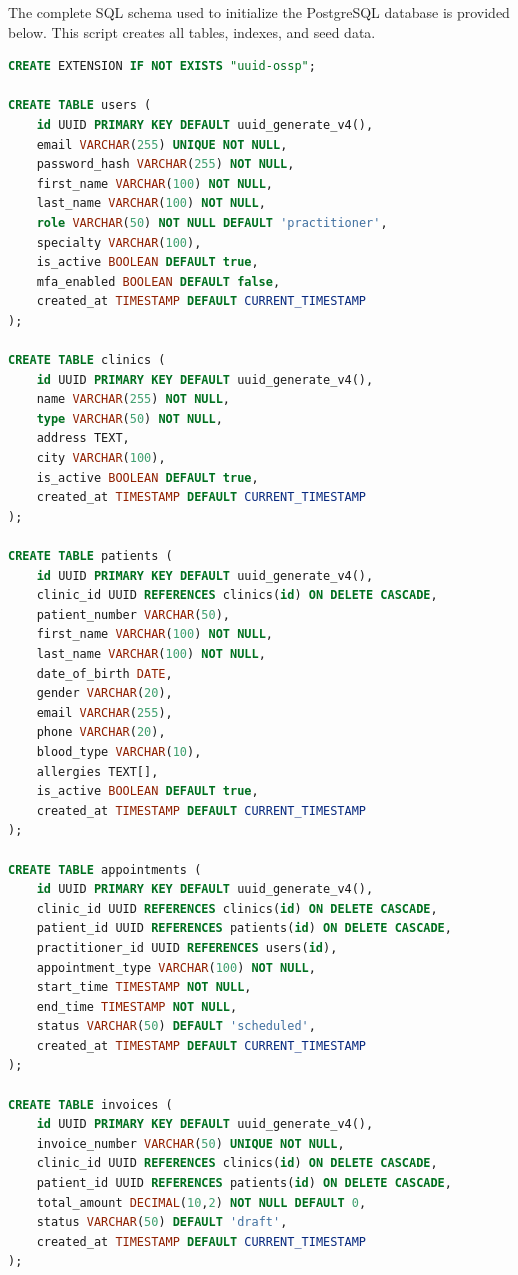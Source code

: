 \documentclass[12pt,a4paper,oneside]{report}
\begin{document}
The complete SQL schema used to initialize the PostgreSQL database is provided below. This script creates all tables, indexes, and seed data.

\begin{lstlisting}[language=SQL, caption={Extract of init.sql — Core tables}, label={lst:schema}]
CREATE EXTENSION IF NOT EXISTS "uuid-ossp";

CREATE TABLE users (
    id UUID PRIMARY KEY DEFAULT uuid_generate_v4(),
    email VARCHAR(255) UNIQUE NOT NULL,
    password_hash VARCHAR(255) NOT NULL,
    first_name VARCHAR(100) NOT NULL,
    last_name VARCHAR(100) NOT NULL,
    role VARCHAR(50) NOT NULL DEFAULT 'practitioner',
    specialty VARCHAR(100),
    is_active BOOLEAN DEFAULT true,
    mfa_enabled BOOLEAN DEFAULT false,
    created_at TIMESTAMP DEFAULT CURRENT_TIMESTAMP
);

CREATE TABLE clinics (
    id UUID PRIMARY KEY DEFAULT uuid_generate_v4(),
    name VARCHAR(255) NOT NULL,
    type VARCHAR(50) NOT NULL,
    address TEXT,
    city VARCHAR(100),
    is_active BOOLEAN DEFAULT true,
    created_at TIMESTAMP DEFAULT CURRENT_TIMESTAMP
);

CREATE TABLE patients (
    id UUID PRIMARY KEY DEFAULT uuid_generate_v4(),
    clinic_id UUID REFERENCES clinics(id) ON DELETE CASCADE,
    patient_number VARCHAR(50),
    first_name VARCHAR(100) NOT NULL,
    last_name VARCHAR(100) NOT NULL,
    date_of_birth DATE,
    gender VARCHAR(20),
    email VARCHAR(255),
    phone VARCHAR(20),
    blood_type VARCHAR(10),
    allergies TEXT[],
    is_active BOOLEAN DEFAULT true,
    created_at TIMESTAMP DEFAULT CURRENT_TIMESTAMP
);

CREATE TABLE appointments (
    id UUID PRIMARY KEY DEFAULT uuid_generate_v4(),
    clinic_id UUID REFERENCES clinics(id) ON DELETE CASCADE,
    patient_id UUID REFERENCES patients(id) ON DELETE CASCADE,
    practitioner_id UUID REFERENCES users(id),
    appointment_type VARCHAR(100) NOT NULL,
    start_time TIMESTAMP NOT NULL,
    end_time TIMESTAMP NOT NULL,
    status VARCHAR(50) DEFAULT 'scheduled',
    created_at TIMESTAMP DEFAULT CURRENT_TIMESTAMP
);

CREATE TABLE invoices (
    id UUID PRIMARY KEY DEFAULT uuid_generate_v4(),
    invoice_number VARCHAR(50) UNIQUE NOT NULL,
    clinic_id UUID REFERENCES clinics(id) ON DELETE CASCADE,
    patient_id UUID REFERENCES patients(id) ON DELETE CASCADE,
    total_amount DECIMAL(10,2) NOT NULL DEFAULT 0,
    status VARCHAR(50) DEFAULT 'draft',
    created_at TIMESTAMP DEFAULT CURRENT_TIMESTAMP
);
\end{lstlisting}
\end{document}
